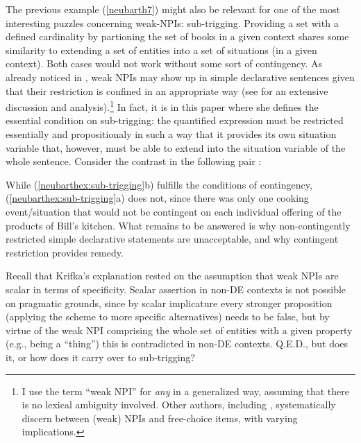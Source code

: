 \documentclass[output=paper,colorlinks,citecolor=brown,
]{langscibook}
\begin{document}
The previous example (\ref{neubarth7}) might also be relevant for one of the most interesting puzzles concerning weak-NPIs: sub-trigging. Providing a set with a defined cardinality by partioning the set of books in a given context shares some similarity to extending a set of entities into a set of situations (in a given context). Both cases would not work without some sort of contingency. 
As already noticed in \citet{legrand1975}, weak NPIs may show up in simple declarative sentences given that
their restriction is confined in an appropriate way (see \citealt{dayal1998} for an extensive discussion and
analysis).\footnote{I use the term “weak NPI” for \textit{any} in a generalized way, assuming that there is no lexical ambiguity involved. Other authors, including \citet{dayal1998}, systematically
discern between (weak) NPIs and free-choice items, with varying implications.} In fact, it is in this paper where she defines
the essential condition on sub-trigging: the quantified expression must be restricted essentially and propositionaly in such a way that it provides its own situation variable that,
however, must be able to extend into the situation variable of the whole sentence. Consider the contrast in
the following pair \citep{dayal1998}:

\begin{exe}
  \ex\label{neubarthex:sub-trigging}
  \begin{xlist}
  \end{xlist}
\end{exe}

While (\ref{neubarthex:sub-trigging}b) fulfills the conditions of contingency, (\ref{neubarthex:sub-trigging}a) does not, since there was only one cooking \mbox{event\slash situation} that would not be contingent on each individual offering of the
products of Bill's kitchen. What remains to be answered is why non-contingently restricted simple declarative
statements are unacceptable, and why contingent restriction provides remedy.

Recall that Krifka's explanation rested on the assumption that weak NPIs are scalar in terms of specificity. Scalar
assertion in non-DE contexts is not possible on pragmatic grounds, since by scalar implicature every stronger
proposition (applying the scheme to more specific alternatives) needs to be false, but by virtue of the weak NPI
comprising the whole set of entities with a given property (e.g., being a “thing”) this is contradicted in non-DE
contexts. Q.E.D., but does it, or how does it carry over to sub-trigging?
\end{document}
